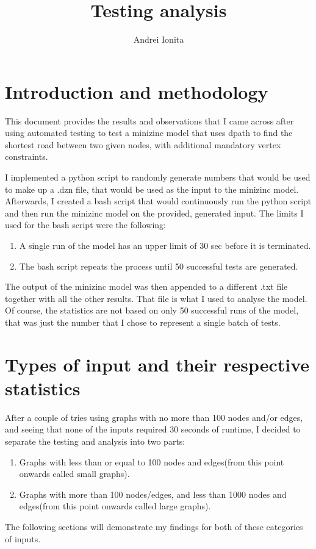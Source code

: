 \documentclass{article}
\title{Testing analysis}
\author{Andrei Ionita}
\begin{document}
\maketitle

\section{Introduction and methodology}
This document provides the results and observations that I came across after using automated testing to test 
a minizinc model that uses dpath to find the shortest road between two given nodes, with additional mandatory vertex
constraints.


I implemented a python script to randomly generate numbers that would be used to make up a .dzn file, that would be used
as the input to the minizinc model. Afterwards, I created a bash script that would continuously run the python script and then
run the minizinc model on the provided, generated input. The limits I used for the bash script were the following:
\begin{enumerate}
    \item A single run of the model has an upper limit of 30 sec before it is terminated.
    \item The bash script repeats the process until 50 successful tests are generated.
\end{enumerate}
The output of the minizinc model was then appended to a different .txt file together with all the other results.
That file is what I used to analyse the model. Of course, the statistics are not based on only 50 successful runs of 
the model, that was just the number that I chose to represent a single batch of tests.

\section{Types of input and their respective statistics}
After a couple of tries using graphs with no more than 100 nodes and/or edges, and seeing that none of the inputs required
30 seconds of runtime, I decided to separate the testing and analysis into two parts: 
\begin{enumerate}
    \item Graphs with less than or equal to 100 nodes and edges(from this point onwards called small graphs).
    \item Graphs with more than 100 nodes/edges, and less than 1000 nodes and edges(from this point onwards called large graphs).
\end{enumerate}
The following sections will demonstrate my findings for both of these categories of inputs.
\end{document}
